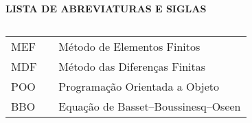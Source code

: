 \newpage

\begin{center}
\textbf{LISTA DE ABREVIATURAS E SIGLAS}
\end{center}
$\!$\\

\begin{tabular}{lll}
MEF & \hspace{1cm} & Método de Elementos Finitos \\
MDF & \hspace{1cm} & Método das Diferenças Finitas \\
POO &  \hspace{1cm} & Programação Orientada a Objeto \\
BBO &  \hspace{1cm} & Equação de Basset–Boussinesq–Oseen \\
\end{tabular}